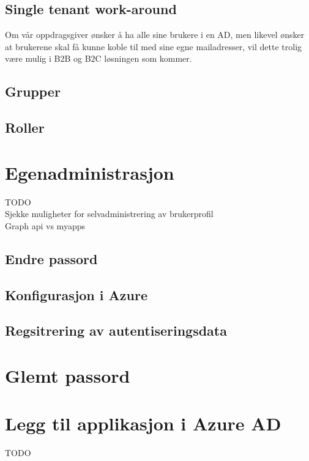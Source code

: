 \subsection{Single tenant work-around}
\label{subsec:konfigurasjon_grupperOgRoller_singleTenantWorkAround}
Om vår oppdragsgiver ønsker å ha alle sine brukere i en AD, men likevel ønsker at brukerene skal få kunne koble til med sine egne mailadresser, vil dette trolig være mulig i B2B og B2C løsningen som kommer.

\subsection{Grupper}
\label{subsec:konfigurasjon_grupperOgRoller_grupper}

\subsection{Roller}
\label{subsec:konfigurasjon_grupperOgRoller_roller}

\section{Egenadministrasjon}
\label{sec:konfigurasjon_endringAvBrukerprofil}
{\color{red}TODO} \\
Sjekke muligheter for selvadministrering av brukerprofil\\
Graph api vs myapps

\subsection{Endre passord}
\label{subsec:konfigurasjon_endringAvBrukerprofil_endrePassord}

\subsection*{Konfigurasjon i Azure}


\subsection*{Regsitrering av autentiseringsdata}


\section{Glemt passord}
\label{sec:konfigurasjon_glemtPassord}

\section{Legg til applikasjon i Azure AD}
\label{sec:konfigurasjon_leggTilApplikasjonIAzureAD}
{\color{red}TODO} \\

